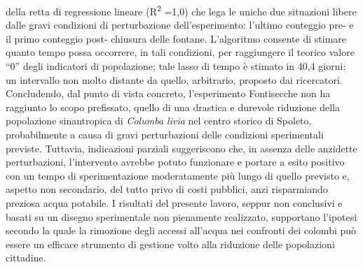 della retta di regressione lineare (R\textsuperscript{2} =1,0) che lega
le uniche due situazioni libere dalle gravi condizioni di perturbazione
dell{\textquoteright}esperimento: l{\textquoteright}ultimo conteggio
pre- e il primo conteggio post- chiusura delle fontane.
L{\textquoteright}algoritmo consente di stimare quanto tempo possa
occorrere, in tali condizioni, per raggiungere il teorico valore
{\textquotedblleft}0{\textquotedblright} degli indicatori di
popolazione; tale lasso di tempo \`e stimato in 40,4\textbf{ }giorni:
un intervallo non molto distante da quello, arbitrario, proposto dai
ricercatori. Concludendo, dal punto di vista concreto,
l{\textquoteright}esperimento Fontisecche non ha raggiunto lo scopo
prefissato, quello di una drastica e durevole riduzione della
popolazione sinantropica di \textit{Columba livia }nel centro storico
di Spoleto, probabilmente a causa di gravi perturbazioni delle
condizioni sperimentali previste. Tuttavia, indicazioni parziali
suggeriscono che, in assenza delle anzidette perturbazioni,
l{\textquoteright}intervento avrebbe potuto funzionare
\textcolor{black}{e }portare a esito positivo con un tempo di
sperimentazione moderatamente pi\`u lungo di quello previsto e, aspetto
non secondario, del tutto privo di costi pubblici, anzi risparmiando
preziosa acqua potabile. I risultati del presente lavoro, seppur non
conclusivi e basati su un disegno sperimentale non pienamente
realizzato, supportano l{\textquoteright}ipotesi secondo la quale la
rimozione degli accessi all{\textquoteright}acqua nei confronti dei
colombi pu\`o essere un efficace strumento di gestione volto alla
riduzione delle popolazioni cittadine.

